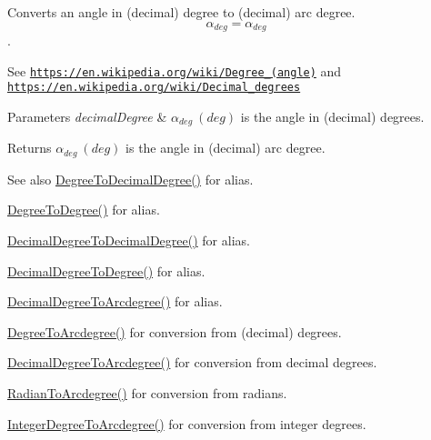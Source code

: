 Converts an angle in (decimal) degree to (decimal) arc degree. \[\alpha_{deg}=\alpha_{deg}\]. 

See \href{https://en.wikipedia.org/wiki/Degree_(angle)}{\tt https\+://en.\+wikipedia.\+org/wiki/\+Degree\+\_\+(angle)} and \href{https://en.wikipedia.org/wiki/Decimal_degrees}{\tt https\+://en.\+wikipedia.\+org/wiki/\+Decimal\+\_\+degrees} 
\begin{DoxyParams}{Parameters}
{\em decimal\+Degree} & $\alpha_{deg}\ (deg)$ is the angle in (decimal) degrees. \\
\hline
\end{DoxyParams}
\begin{DoxyReturn}{Returns}
$\alpha_{deg}\ (deg)$ is the angle in (decimal) arc degree. 
\end{DoxyReturn}
\begin{DoxySeeAlso}{See also}
\mbox{\hyperlink{group___e_g_x_math-_angle_conversions-_degree_ga568afc1d436d425bf5d4edea584aee08}{Degree\+To\+Decimal\+Degree()}} for alias. 

\mbox{\hyperlink{group___e_g_x_math-_angle_conversions-_degree_gaca157e7d3e99a46a11a04b92680d2574}{Degree\+To\+Degree()}} for alias. 

\mbox{\hyperlink{group___e_g_x_math-_angle_conversions-_decimal_degree_gafccf9cd779903872887978ab9d79661f}{Decimal\+Degree\+To\+Decimal\+Degree()}} for alias. 

\mbox{\hyperlink{group___e_g_x_math-_angle_conversions-_decimal_degree_ga0aa7f2f5dbb00cf4ab303421c6e33ccf}{Decimal\+Degree\+To\+Degree()}} for alias. 

\mbox{\hyperlink{group___e_g_x_math-_angle_conversions-_decimal_degree_gacdd463fcabffeb598ebda65b012ce743}{Decimal\+Degree\+To\+Arcdegree()}} for alias. 

\mbox{\hyperlink{group___e_g_x_math-_angle_conversions-_degree_gac1b5f3b68f66c77a6df4ceef842c9b19}{Degree\+To\+Arcdegree()}} for conversion from (decimal) degrees. 

\mbox{\hyperlink{group___e_g_x_math-_angle_conversions-_decimal_degree_gacdd463fcabffeb598ebda65b012ce743}{Decimal\+Degree\+To\+Arcdegree()}} for conversion from decimal degrees. 

\mbox{\hyperlink{group___e_g_x_math-_angle_conversions-_radian_ga3dfdc97357cc07f8379976bbc08f9852}{Radian\+To\+Arcdegree()}} for conversion from radians. 

\mbox{\hyperlink{group___e_g_x_math-_angle_conversions-_integer_degree_gaf633d0b82bfb7586ce86ffbcf78d8f7a}{Integer\+Degree\+To\+Arcdegree()}} for conversion from integer degrees. 


\end{DoxySeeAlso}
